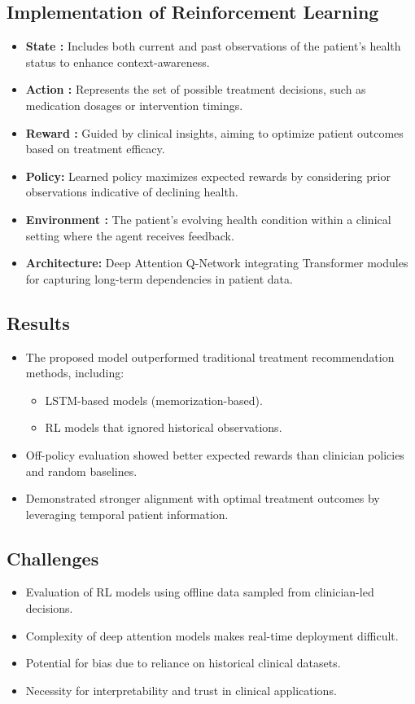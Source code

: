 \subsection*{Implementation of Reinforcement Learning}
\begin{itemize}
    \item \textbf{State :} Includes both current and past observations of the patient's health status to enhance context-awareness.
    \item \textbf{Action :} Represents the set of possible treatment decisions, such as medication dosages or intervention timings.
    \item \textbf{Reward :} Guided by clinical insights, aiming to optimize patient outcomes based on treatment efficacy.
    \item \textbf{Policy:} Learned policy maximizes expected rewards by considering prior observations indicative of declining health.
    \item \textbf{Environment :} The patient's evolving health condition within a clinical setting where the agent receives feedback.
    \item \textbf{Architecture:} Deep Attention Q-Network integrating Transformer modules for capturing long-term dependencies in patient data.
\end{itemize}

\subsection*{Results}
\begin{itemize}
    \item The proposed model outperformed traditional treatment recommendation methods, including:
    \begin{itemize}
        \item LSTM-based models (memorization-based).
        \item RL models that ignored historical observations.
    \end{itemize}
    \item Off-policy evaluation showed better expected rewards than clinician policies and random baselines.
    \item Demonstrated stronger alignment with optimal treatment outcomes by leveraging temporal patient information.
\end{itemize}

\subsection*{Challenges}
\begin{itemize}
    \item Evaluation of RL models using offline data sampled from clinician-led decisions.
    \item Complexity of deep attention models makes real-time deployment difficult.
    \item Potential for bias due to reliance on historical clinical datasets.
    \item Necessity for interpretability and trust in clinical applications.
\end{itemize}

